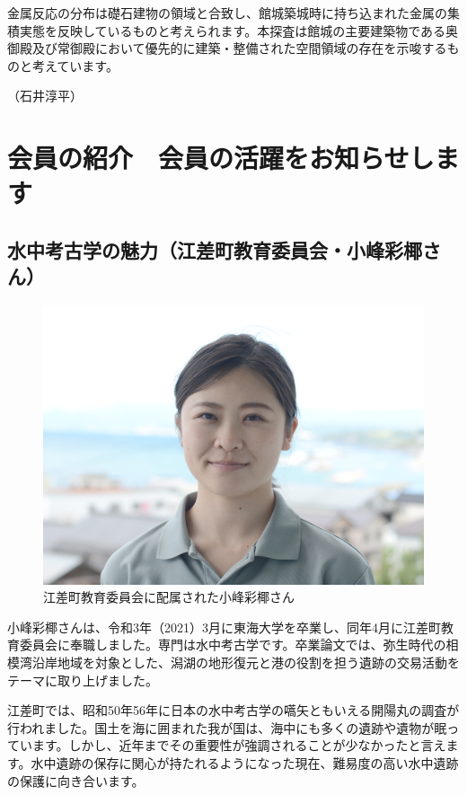 \documentclass[a4j,11pt,twocolumn,openany]{jsbook}
\begin{document}
金属反応の分布は礎石建物の領域と合致し、館城築城時に持ち込まれた金属の集積実態を反映しているものと考えられます。本探査は館城の主要建築物である奥御殿及び常御殿において優先的に建築・整備された空間領域の存在を示唆するものと考えています。

\begin{flushright}
	（石井淳平）
\end{flushright}


\chapter{会員の紹介　会員の活躍をお知らせします}

\section{水中考古学の魅力（江差町教育委員会・小峰彩椰さん）}

\begin{figure}[h]
	\vspace{-1\baselineskip}
	\centering
	\includegraphics[width=\linewidth]{fig/02_Komine/Komine01.png}
	\caption{江差町教育委員会に配属された小峰彩椰さん}
	\label{}
	\vspace{-\baselineskip}
\end{figure}

小峰彩椰さんは、令和3年（2021）3月に東海大学を卒業し、同年4月に江差町教育委員会に奉職しました。専門は水中考古学です。卒業論文では、弥生時代の相模湾沿岸地域を対象とした、潟湖の地形復元と港の役割を担う遺跡の交易活動をテーマに取り上げました。

江差町では、昭和50年56年に日本の水中考古学の嚆矢ともいえる開陽丸の調査が行われました。国土を海に囲まれた我が国は、海中にも多くの遺跡や遺物が眠っています。しかし、近年までその重要性が強調されることが少なかったと言えます。水中遺跡の保存に関心が持たれるようになった現在、難易度の高い水中遺跡の保護に向き合います。
\end{document}
